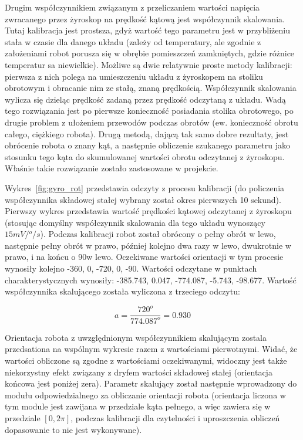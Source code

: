 Drugim współczynnikiem związanym z przeliczaniem wartości napięcia zwracanego
przez żyroskop na prędkość kątową jest współczynnik skalowania. Tutaj kalibracja
jest prostsza, gdyż wartość tego parametru jest w przybliżeniu stała w czasie
dla danego układu (zależy od temperatury, ale zgodnie z założeniami robot
porusza się w obrębie pomieszczeń zamkniętych, gdzie różnice temperatur sa
niewielkie). Możliwe są dwie relatywnie proste metody kalibracji: pierwsza z
nich polega na umieszczeniu układu z żyroskopem na stoliku obrotowym i obracanie
nim ze stałą, znaną prędkością. Współczynnik skalowania wylicza się dzieląc
prędkość zadaną przez prędkość odczytaną z układu. Wadą tego rozwiązania jest po
pierwsze konieczność posiadania stolika obrotowego, po drugie problem z
ułożeniem przewodów podczas obrotów (ew. konieczność obrotu całego, ciężkiego
robota). Drugą metodą, dającą tak samo dobre rezultaty, jest obrócenie robota o
znany kąt, a następnie obliczenie szukanego parametru jako stosunku tego kąta do
skumulowanej wartości obrotu odczytanej z żyroskopu. Właśnie takie rozwiązanie
zostało zastosowane w projekcie.

Wykres~\ref{fig:gyro_rot} przedstawia odczyty z procesu kalibracji (do
policzenia współczynnika składowej stałej wybrany został okres pierwszych 10
sekund). Pierwszy wykres przedstawia wartość prędkości kątowej odczytanej z
żyroskopu (stosując domyślny współczynnik skalowania dla tego układu wynoszący
$15mV/{}^o/s$). Podczas kalibracji robot został obrócony o pełny obrót w
lewo, następnie pełny obrót w prawo, później kolejno dwa razy w lewo, dwukrotnie
w prawo, i na końcu o 90\textdegree w lewo. Oczekiwane wartości orientacji w tym
procesie wynosiły kolejno -360\textdegree, 0\textdegree, -720\textdegree,
0\textdegree, -90\textdegree. Wartości odczytane w punktach charakterystycznych
wynosiły: -385.743\textdegree, 0.047\textdegree, -774.087\textdegree,
-5.743\textdegree, -98.677\textdegree. Wartość współczynnika skalującego została
wyliczona z trzeciego odczytu:

\[
a = \frac{720^o}{774.087^o} = 0.930
\]

Orientacja robota z uwzględnionym współczynnikiem skalującym zostala
przedsationa na wspólnym wykresie razem z wartościami pierwotnymi. Widać, że
wartości obliczone są zgodne z wartościami oczekiwanymi, widoczny jest także
niekorzystny efekt związany z dryfem wartości składowej stałej (orientacja
końcowa jest poniżej zera). Parametr skalujący został następnie wprowadzony
do modułu odpowiedzialnego za obliczanie orientacji robota (orientacja liczona
w tym module jest zawijana w przedziale kąta pełnego, a więc zawiera się w
przedziale $[0, 2\pi]$, podczas kalibracji dla czytelności i uproszczenia
obliczeń dopasowanie to nie jest wykonywane).

